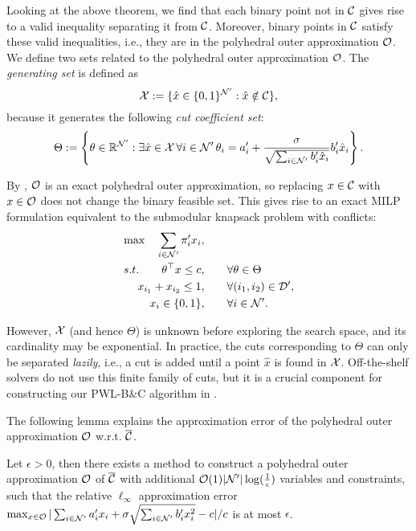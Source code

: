 Looking at the above theorem, we find that each binary point not in $\mathcal C$ gives rise to a valid inequality separating it from $\mathcal C$. Moreover, binary points in $\mathcal C$ satisfy these valid inequalities, i.e., they are in the polyhedral outer approximation $\mathcal O$. We define two sets related to the polyhedral outer approximation $\mathcal O$.  The \textit{generating set} is defined as
\begin{equation}
\label{eq.gen}
    \mathcal X:=\{\hat{x} \in \{0,1\}^{\mathcal N'}: \hat{x} \notin \mathcal C\},
\end{equation} because it generates the following \textit{cut coefficient set}:
\begin{equation}
    \label{corecuts}
    \Theta := \left\{\theta \in \mathbb R^{\mathcal N'}: \exists \hat{x}  \in \mathcal X \,  \forall i \in \mathcal N' \, \theta_i=  a'_i  + \frac{\sigma}{  \sqrt{\sum_{i\in \mathcal N'} b'_i \hat{x}_i}}  b'_i \hat{x}_i\right\}.
\end{equation}

By , $\mathcal O$ is an exact polyhedral outer approximation, so replacing $x \in \mathcal C$ with $x \in \mathcal O$ does not change the binary feasible set. This gives rise to an exact MILP formulation equivalent to the submodular knapsack problem with conflicts:
    \begin{subequations}
    \label{pricing.ref.milp}
    \begin{align}
  		 \max \quad \sum_{i\in \mathcal N'} \pi'_i x_i, \qquad& \\
   	 s.t. \qquad  \theta^\top x\le c, \qquad&  \forall \theta \in \Theta\\
   	 x_{i_1} + x_{i_2} \le 1, \qquad & \forall (i_1, i_2) \in \mathcal D', \\
   	 x_i \in \{0,1\},\qquad & \forall  i  \in \mathcal N'.
    \end{align}
    \end{subequations}


However, $\mathcal X$ (and hence $\Theta$) is unknown before exploring the search space, and its cardinality may be exponential. In practice, the cuts corresponding to $\Theta$ can only be separated \textit{lazily}, i.e., a cut is added until a point $\hat{x}$ is found in $\mathcal X$. Off-the-shelf solvers do not use this finite family of cuts, but it is a crucial component for constructing our PWL-B$\&$C algorithm in .

The following lemma explains the approximation error of the  polyhedral outer approximation $\mathcal O$ w.r.t. $\overline{\mathcal C}$.

\begin{lemma}
\label{lem.pout}
Let \(\epsilon > 0\), then there exists a method to construct a  polyhedral outer approximation $\mathcal O$ of \( \overline{\mathcal C}\) with additional \({\mathcal{O}(1)}|\mathcal N'|\log(\frac{1}{\epsilon})\) variables and constraints, such that the relative \(\ell_\infty\) approximation error \(\max_{x \in \mathcal O} |\sum_{i \in \mathcal N'} a'_i x_i  + \sigma\sqrt{\sum_{i\in \mathcal N'} b'_i x_i^2 } - c| / c\) is at most \(\epsilon\).
\end{lemma}


